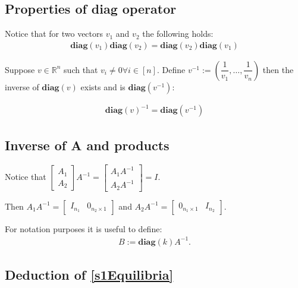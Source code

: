 \documentclass[3p,times]{article}
\newcommand{\R}{\mathbb{R}}
\newcommand{\diag}{\textbf{diag}}
\begin{document}
\subsection{Properties of diag operator}

Notice that for two vectors $v_1$ and $v_2$ the following holds:
\begin{align}
\diag(v_1)\diag(v_2) = \diag(v_2)\diag(v_1) 
\end{align}

Suppose $v \in \R^n$ such that $v_i \neq 0 \forall i \in [n]$. Define $v^{-1}:= \left( \dfrac{1}{v_1},\dots,\dfrac{1}{v_n} \right)$ then the inverse of $\diag(v)$ exists and is $\diag(v^{-1})$:

\begin{align}
\diag(v)^{-1} = \diag(v^{-1}) 
\end{align}

\subsection{Inverse of A and products}
Notice that $\begin{bmatrix}
A_1 \\ A_2
\end{bmatrix} A^{-1} = \begin{bmatrix}
A_1A^{-1} \\ A_2A^{-1}
\end{bmatrix}=I $.

Then $A_1A^{-1}= \begin{bmatrix}
I_{n_1}& 0_{n_2 \times 1} 
\end{bmatrix}$ and $A_2A^{-1}= \begin{bmatrix}
0_{n_1 \times 1} & I_{n_2}
\end{bmatrix}$.

For notation purposes it is useful to define: \begin{align}
B := \diag(k) A^{-1}.
\end{align}

\subsection{Deduction of  \eqref{s1Equilibria}}
\end{document}

